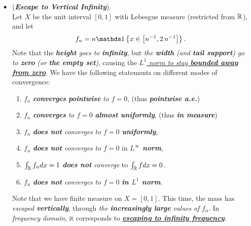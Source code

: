 \documentclass[11pt]{article}
\begin{document}
\begin{itemize}
\item \begin{example} (\emph{\textbf{Escape to Vertical Infinity}}).\\  
Let $X$ be the unit interval $[0, 1]$ with Lebesgue measure (restricted from ${\mathbb R}$), and let 
\begin{align*}
f_n = n\ind{x \in\brac{ n^{-1}, 2\,n^{-1}}}.
\end{align*} Note that the \emph{\textbf{height} goes to \textbf{infinity}}, but \emph{the \textbf{width} (and \textbf{tail support}) go to \textbf{zero} (or \textbf{the empty set})}, causing the \underline{\emph{$L^1$ norm to stay \textbf{bounded away from zero}}}. We have the following statements on different modes of convergence:
\begin{enumerate}
\item $f_n$ \emph{\textbf{converges} \textbf{pointwise} to $f = 0$}, (thus \textbf{\emph{pointwise a.e.}})
\item  $f_n$ \emph{\textbf{converges} to $f = 0$} \emph{\textbf{almost uniformly}}, (thus \emph{\textbf{in measure}}) 
\item  $f_n$ \emph{\textbf{does not} converges  to $f = 0$ \textbf{uniformly}},
\item  $f_n$ \emph{\textbf{does not} converges to $f = 0$} in \emph{\textbf{$L^{\infty}$ norm}}, 
\item $\int_{{\mathbb R}}f_{n} dx = 1$ \emph{\textbf{does not} converge} to $\int_{{\mathbb R}}f dx = 0$.
\item  $f_n$ \emph{\textbf{does not} converges to $f = 0$} \emph{\textbf{in $L^1$ norm}}. 
\end{enumerate} Note that we have finite measure on $X  = [0, 1]$. This time, the mass has \emph{escaped \textbf{vertically}}, through \emph{the \textbf{increasingly large} values of $f_n$}.  In \emph{frequency domain}, it corresponds to \underline{\emph{\textbf{escaping to infinity frequency}}}. 
\end{example}


\end{itemize}
\end{document}
